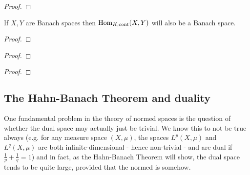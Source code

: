             \begin{proof}
                
            \end{proof}
        \begin{corollary} \label{coro: hom_between_banach_spaces_are_banach_spaces}
            If $X, Y$ are Banach spaces then $\mathrm{Hom}_{K, \mathrm{cont}}(X, Y)$ will also be a Banach space.
        \end{corollary}
            \begin{proof}
                
            \end{proof}

        \begin{theorem} \label{theorem: open_mapping}
            
        \end{theorem}
            \begin{proof}
                
            \end{proof}

        \begin{theorem} \label{theorem: closed_graph}
            
        \end{theorem}
            \begin{proof}
                
            \end{proof}

    \subsection{The Hahn-Banach Theorem and duality}
        One fundamental problem in the theory of normed spaces is the question of whether the dual space may actually just be trivial. We know this to not be true always (e.g. for any measure space $(X, \mu)$, the spaces $L^p(X, \mu)$ and $L^q(X, \mu)$ are both infinite-dimensional - hence non-trivial - and are dual if $\frac1p + \frac1q = 1$) and in fact, as the Hahn-Banach Theorem will show, the dual space tends to be quite large, provided that the normed is  somehow.

